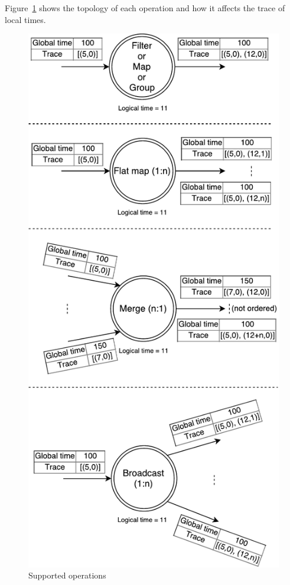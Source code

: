 Figure~\ref{logical-graph-ops-figure} shows the topology of each operation and how it affects the trace of local times.

\begin{figure}[htbp]
  \centering
  \includegraphics[scale=0.5]{pics/operations}
  \caption{Supported operations}
  \label {logical-graph-ops-figure}
\end{figure}

